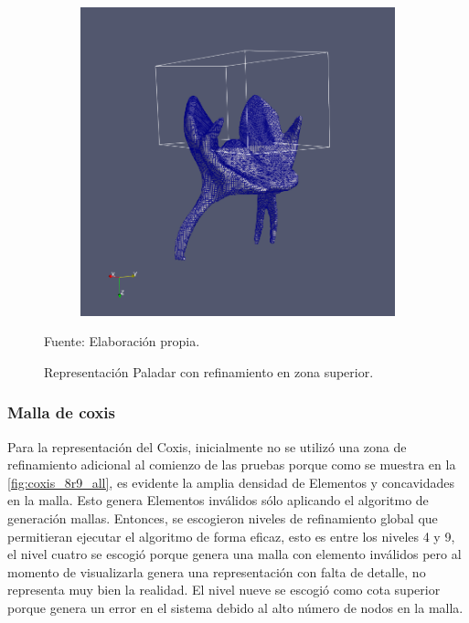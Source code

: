 \begin{figure}[!ht]
    \centering
    \begin{subfigure}[t]{0.8\textwidth}
        \includegraphics[width=1.0\textwidth]{figures/meshes/palate_5r7_01.png}
    \end{subfigure}
    \caption{ Representación Paladar con refinamiento en zona superior. }
    Fuente: Elaboración propia.
    \label{fig:palate_5r7_all}
\end{figure}

\subsubsection{Malla de coxis}

Para la representación del Coxis, inicialmente no se utilizó una zona de refinamiento adicional al comienzo de las pruebas porque como se muestra en la \autoref{fig:coxis_8r9_all}, es evidente la amplia densidad de Elementos y concavidades en la malla. Esto genera Elementos inválidos sólo aplicando el algoritmo de generación mallas. Entonces, se escogieron niveles de refinamiento global que permitieran ejecutar el algoritmo de forma eficaz, esto es entre los niveles 4 y 9, el nivel cuatro se escogió porque genera una malla con elemento inválidos pero al momento de visualizarla genera una representación con falta de detalle, no representa muy bien la realidad. El nivel nueve se escogió como cota superior porque genera un error en el sistema debido al alto número de nodos en la malla.

